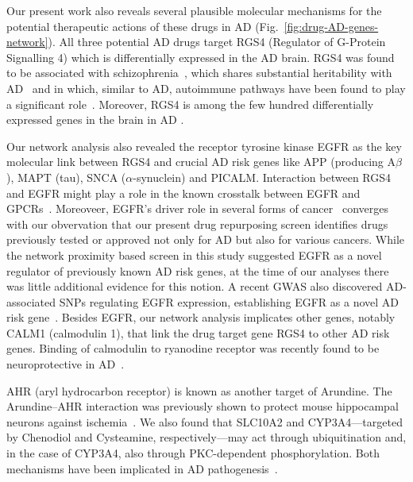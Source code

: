\documentclass[letterpaper]{article}
\begin{document}
Our present work
also reveals several plausible molecular mechanisms for the potential
therapeutic actions of these drugs in AD
(Fig.~\ref{fig:drug-AD-genes-network}).  All three potential AD drugs target
RGS4 (Regulator of G-Protein Signalling 4) which is differentially expressed
in the AD brain.  RGS4 was found to be associated
with schizophrenia~\citep{Chowdari2002}, which shares substantial
heritability with AD~\citep{Consortium2018} and in which, similar to AD,
autoimmune pathways have been found to play a significant
role~\citep{Sekar2016a}.  Moreover, RGS4 is among the few hundred
differentially expressed genes in the brain in AD
\cite{Taubes2021}.

Our network analysis also revealed the receptor tyrosine kinase EGFR as the key
molecular link between RGS4 and crucial AD risk genes like APP (producing
A$\beta$), MAPT (tau), SNCA ($\alpha$-synuclein) and PICALM.  Interaction
between RGS4 and EGFR might play a role in the known crosstalk between EGFR
and GPCRs~\cite{Wang2016c}.  Moreoveer, EGFR's driver role in several forms of
cancer~\cite{Sigismund2018} converges with our obvervation that our present
drug repurposing screen identifies drugs previously tested or
approved not only for AD but also for various cancers.  While
the network proximity based screen in this study suggested EGFR as a novel
regulator of previously known AD risk genes, at the time of our analyses there was
little additional evidence for this notion.  A recent GWAS also
discovered AD-associated SNPs regulating EGFR expression, establishing EGFR as
a novel AD risk gene~\cite{Bellenguez2022}.  Besides EGFR, our network analysis implicates
other genes, notably CALM1 (calmodulin 1), that link the drug target gene RGS4 to
other AD risk genes.  Binding of calmodulin to ryanodine receptor was recently found
to be neuroprotective in AD~\cite{Nakamura2021}.

AHR (aryl hydrocarbon receptor) is known as another target of Arundine.  The
Arundine--AHR interaction was previously shown to protect mouse hippocampal
neurons against ischemia~\cite{Rzemieniec2019}.  We also found that SLC10A2
and CYP3A4---targeted by Chenodiol and Cysteamine, respectively---may act
through ubiquitination and, in the case of CYP3A4, also through PKC-dependent
phosphorylation.  Both mechanisms have been implicated in AD
pathogenesis~\cite{Hegde2019,Alfonso2016}.
\end{document}
